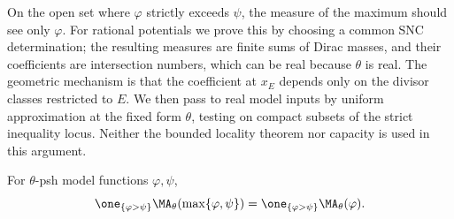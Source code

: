 On the open set where \(\varphi\) strictly exceeds \(\psi\), the measure
of the maximum should see only \(\varphi\).  For rational potentials we
prove this by choosing a common SNC determination; the resulting
measures are finite sums of Dirac masses, and their coefficients are
intersection numbers, which can be real because \(\theta\) is real.
The geometric mechanism is that the coefficient at \(x_E\) depends only
on the divisor classes restricted to \(E\).  We then pass to real model
inputs by uniform approximation at the fixed form \(\theta\), testing on
compact subsets of the strict inequality locus.  Neither the bounded
locality theorem nor capacity is used in this argument.

\begin{proposition}\label{prop:model-maximum-principle}
For \(\theta\)-psh model functions \(\varphi,\psi\),
\begin{equation}
\label{eq:model-maximum-principle}
 \one_{\{\varphi>\psi\}}
 \MA_\theta(\max\{\varphi,\psi\})
 =\one_{\{\varphi>\psi\}}\MA_\theta(\varphi).
\end{equation}
\end{proposition}


